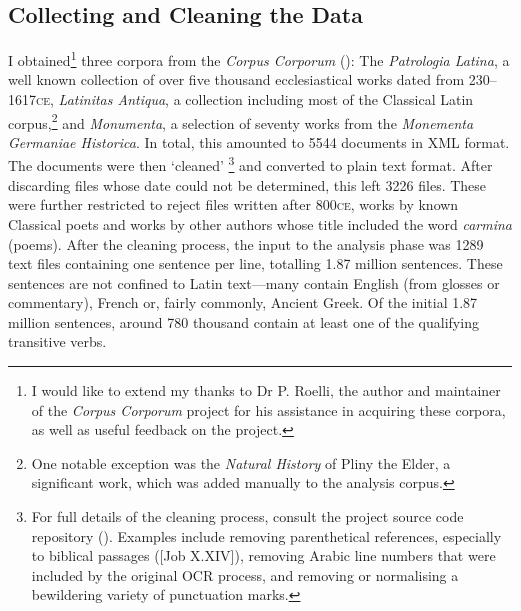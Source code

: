 \documentclass[11pt,a4paper]{scrartcl} %
\begin{document}
\subsection{Collecting and Cleaning the Data}
I obtained\footnote{%
I would like to extend my thanks to Dr P. Roelli, the author and maintainer of the \textit{Corpus Corporum} project for his assistance in acquiring these corpora, as well as useful feedback on the project.}
three corpora from the \textit{Corpus Corporum} (\cite{CC}): The \textit{Patrologia Latina}, a well known collection of over five thousand ecclesiastical works dated from 230--1617\textsc{ce}, \textit{Latinitas Antiqua}, a collection including most of the Classical Latin corpus,\footnote{One notable exception was the \textit{Natural History} of Pliny the Elder, a significant work, which was added manually to the analysis corpus.} and \textit{Monumenta}, a selection of seventy works from the \textit{Monementa Germaniae Historica}. In total, this amounted to 5544 documents in XML format. The documents were then `cleaned'%
\footnote{For full details of the cleaning process, consult the project source code repository (\cite{ovvo}). Examples include removing parenthetical references, especially to biblical passages ([Job X.XIV]), removing Arabic line numbers that were included by the original OCR process, and removing or normalising a bewildering variety of punctuation marks.
}
and converted to plain text format. After discarding files whose date could not be determined, this left 3226 files. These were further restricted to reject files written after 800\textsc{ce}, works by known Classical poets and works by other authors whose title included the word \textit{carmina} (poems). After the cleaning process, the input to the analysis phase was 1289 text files containing one sentence per line, totalling 1.87 million sentences. These sentences are not confined to Latin text---many contain English (from glosses or commentary), French or, fairly commonly, Ancient Greek. Of the initial 1.87 million sentences, around 780 thousand contain at least one of the qualifying transitive verbs.
\end{document}
